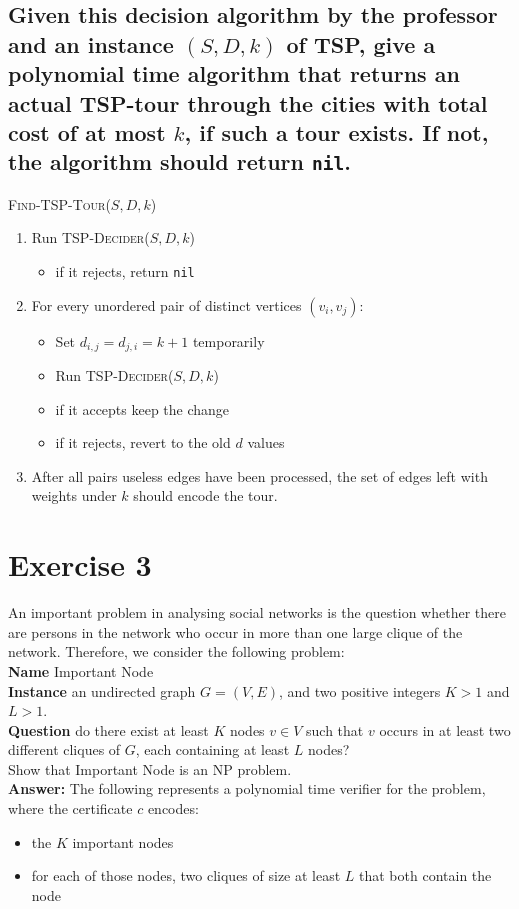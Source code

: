 \documentclass[a4paper,11pt]{article}
\begin{document}
	\subsection{Given this decision algorithm by the professor and an instance $(S,D,k)$ of TSP, give a polynomial time algorithm that returns an actual TSP-tour through the cities with total cost of at most $k$, if such a tour exists. If not, the algorithm should return \texttt{nil}.}
	\textsc{Find-TSP-Tour($S,D,k$)}
	\begin{enumerate}
		\item Run \textsc{TSP-Decider($S,D,k$)}
		\begin{itemize}
			\item if it rejects, return \texttt{nil}
		\end{itemize}
		\item For every unordered pair of distinct vertices $(v_i,v_j)$:
		\begin{itemize}
			\item Set $d_{i,j}=d_{j,i}=k+1$ temporarily
			\item Run \textsc{TSP-Decider($S,D,k$)}
			\item if it accepts keep the change
			\item if it rejects, revert to the old $d$ values
		\end{itemize}
		\item After all pairs useless edges have been processed, the set of edges left with weights under $k$ should encode the tour.
	\end{enumerate}

	\section{Exercise 3}
	An important problem in analysing social networks is the question whether there are persons in the network who occur in more than one large clique of the network. Therefore, we consider the following problem:\\
	\textbf{Name} Important Node\\
	\textbf{Instance} an undirected graph $G=(V,E)$, and two positive integers $K>1$ and $L>1$.\\
	\textbf{Question} do there exist at least $K$ nodes $v \in V$ such that $v$ occurs in at least two different cliques of $G$, each containing at least $L$ nodes?\\

	Show that Important Node is an NP problem.\\
	\textbf{Answer: }The following represents a polynomial time verifier for the problem, where the certificate $c$ encodes:
	\begin{itemize}
		\item the $K$ important nodes
		\item for each of those nodes, two cliques of size at least $L$ that both contain the node
	\end{itemize}
\end{document}
